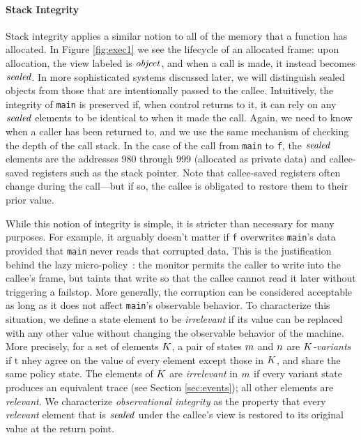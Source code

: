 \documentclass[10pt,conference]{ieeetran}%
\theoremstyle{definition}
\begin{document}
\paragraph*{Stack Integrity}

Stack integrity applies a similar  notion to all of the memory that a function has
allocated. In Figure \ref{fig:exec1} we see the lifecycle of an allocated frame:
upon allocation, the view labeled is \(\mathit{object}\), and when a call is made, it instead
becomes \(\mathit{sealed}\). In more sophisticated systems discussed later, we will distinguish
sealed objects from those that are intentionally passed to the callee. 
Intuitively, the integrity of {\tt main}
is preserved if, when control returns to it, it can rely on any \(\mathit{sealed}\) elements
to be identical to when it made the call.
%
Again, we need to know when a caller has been returned to,
and we use the same mechanism of checking the depth of the call stack.
%
In the case of the call from {\tt main} to {\tt f}, the \(\mathit{sealed}\) elements are the
addresses 980 through 999 (allocated as private data) and callee-saved registers such as
the stack pointer. Note that callee-saved registers often change
during the call---but if so, the callee is obligated to restore them to their prior value.

While this notion of integrity is simple, it is stricter than necessary for many purposes.
For example, it arguably doesn't matter if {\tt f} overwrites {\tt main}'s data provided that {\tt main} never
reads that corrupted data.  This is the justification behind the lazy micro-policy~\cite{??}:
the monitor permits the caller to write into the
callee's frame, but taints that write so that the callee cannot read it later without
triggering a failstop. More generally, the corruption can be considered acceptable
as long as it does not affect {\tt main}'s observable behavior. 
To characterize this situation, we define a state element to be \emph{irrelevant}
if its value can be replaced with any other value without changing the observable behavior
of the machine. More precisely, for a set of elements \(K\),
a pair of states \(m\) and \(n\)
are {\em \(K\)-variants} if t nhey agree on the value of every
element except those in \(K\), and share the same policy state.
The elements of \(K\) are \emph{irrelevant} in \(m\) if every variant state produces an equivalent trace
(see Section \ref{sec:events}); all other elements are \emph{relevant}.
We characterize \emph{observational integrity} as the property that
every \emph{relevant} element that is \(\mathit{sealed}\) under the callee's view is restored
to its original value at the return point.
\end{document}
